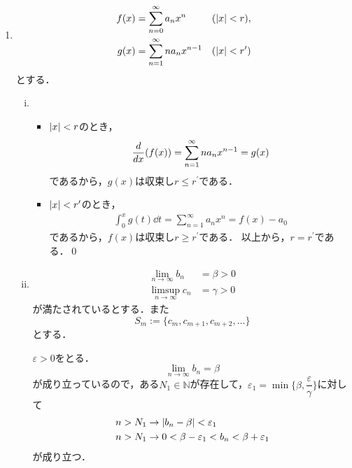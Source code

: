 \begin{enumerate}[(1)]
\begin{proof}
    \end{proof}
        \item 
        \begin{align}
            f(x)&=\sum_{n=0}^\infty a_nx^n&(\abs{x}<r),\\
            g(x)&=\sum_{n=1}^\infty na_nx^{n-1}&(\abs{x}<r^\prime)
        \end{align}
        とする．
        \begin{enumerate}[(i)]
            \item 
            \begin{itemize}
                \item $\abs{x}<r$のとき，
                \begin{align}
                    \dv{x}(f(x))=\sum_{n=1}^\infty na_nx^{n-1}=g(x)
                \end{align}
                であるから，$g(x)$は収束し$r\le r^\prime$である．
                \item $\abs{x}<r^\prime$のとき，
                \begin{align}
                    \int_{0}^xg(t)\dd{t}=\sum_{n=1}^\infty a_nx^{n}=f(x)-a_0
                \end{align}
                であるから，$f(x)$は収束し$r\ge r^\prime$である．
                以上から，$r=r^\prime$である．\qed
            \end{itemize}
        \item 
        \begin{align}
            \lim_{n\to\infty}b_n&=\beta>0\\
            \limsup_{n\to\infty}c_n&=\gamma>0
        \end{align}
        が満たされているとする．また
        \begin{equation}
            S_m:=\{c_m, c_{m+1},c_{m+2},\dots\}
        \end{equation}
        とする．

        $\varepsilon>0$をとる．
        \begin{equation}
            \lim_{n\to\infty}b_n=\beta
        \end{equation}
        が成り立っているので，ある$N_1\in\mathbb{N}$が存在して，$\varepsilon_1=\min\{\beta,\dfrac{\varepsilon}{\gamma}\}$に対して
        \begin{align}
            n>N_1&\to \abs{b_n - \beta}<\varepsilon_1\\
            n>N_1&\to 0<\beta - \varepsilon_1 <b_n <\beta + \varepsilon_1\label{eq:3_2_b}
        \end{align}
        が成り立つ．


\end{enumerate}
\end{enumerate}
